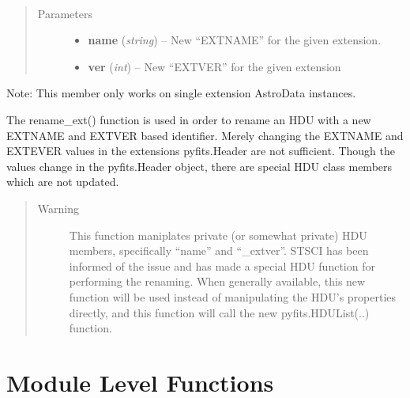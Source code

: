 \documentclass[letterpaper,10pt,english]{sphinxmanual}
\begin{document}
\begin{fulllineitems}
\label{chapter_AstroDataClass:astrodata.data.AstroData.rename_ext}~\begin{quote}\begin{description}
\item[{Parameters}] \leavevmode\begin{itemize}
\item {} 
\textbf{name} (\emph{string}) -- New ``EXTNAME'' for the given extension.

\item {} 
\textbf{ver} (\emph{int}) -- New ``EXTVER'' for the given extension

\end{itemize}

\end{description}\end{quote}

Note: This member only works on single extension AstroData instances.

The rename\_ext() function is used in order to rename an HDU with a new
EXTNAME and EXTVER based identifier.  Merely changing the EXTNAME and 
EXTEVER values in the extensions pyfits.Header are not sufficient.
Though the values change in the pyfits.Header object, there are special
HDU class members which are not updated.
\begin{quote}\begin{description}
\item[{Warning }] \leavevmode
This function maniplates private (or somewhat private)  HDU
members, specifically ``name'' and ``\_extver''. STSCI has been
informed of the issue and
has made a special HDU function for performing the renaming. 
When generally available, this new function will be used instead of
manipulating the  HDU's properties directly, and this function will 
call the new pyfits.HDUList(..) function.

\end{description}\end{quote}

\end{fulllineitems}



\section{Module Level Functions}
\label{chapter_AstroDataClass:module-level-functions}
\end{document}

